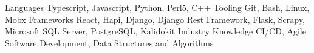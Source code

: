 
\begin{cvskills}
  \cvskill
    {Languages} %
    {Typescript, Javascript, Python, Perl5, C++} %
  \cvskill
    {Tooling}
    {Git, Bash, Linux, Mobx}
  \cvskill
    {Frameworks} %
    {React, Hapi, Django, Django Rest Framework, Flask, Scrapy, Microsoft SQL Server, PostgreSQL, Kalidokit} %
  \cvskill
    {Industry Knowledge}
    {CI/CD, Agile Software Development, Data Structures and Algorithms}
\end{cvskills}
